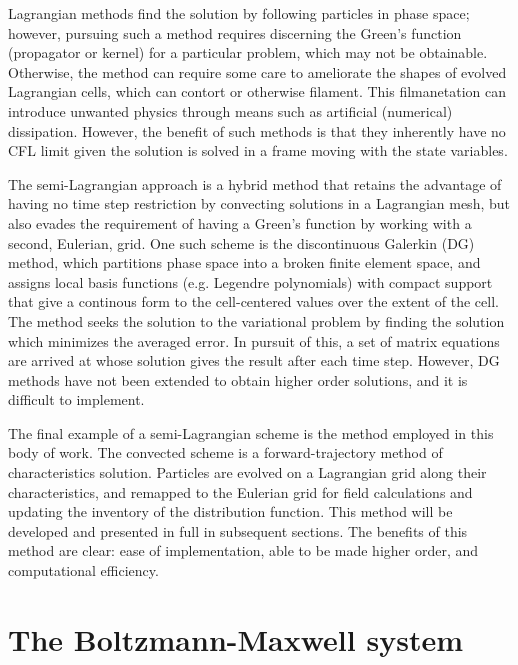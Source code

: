 \documentclass[11pt,titlepage]{report}
\begin{document}
Lagrangian methods find the solution by following particles in phase space; however, pursuing such a method requires discerning the Green's function (propagator or kernel) for a particular problem, which may not be obtainable. Otherwise, the method can require some care to ameliorate the shapes of evolved Lagrangian cells, which can contort or otherwise filament. This filmanetation can introduce unwanted physics through means such as artificial (numerical) dissipation. However, the benefit of such methods is that they inherently have no CFL limit given the solution is solved in a frame moving with the state variables. 

The semi-Lagrangian approach is a hybrid method that retains the advantage of having no time step restriction by convecting solutions in a Lagrangian mesh, but also evades the requirement of having a Green's function by working with a second, Eulerian, grid. One such scheme is the discontinuous Galerkin (DG) method, which partitions phase space into a broken finite element space, and assigns local basis functions (e.g. Legendre polynomials) with compact support that give a continous form to the cell-centered values over the extent of the cell. The method seeks the solution to the variational problem by finding the solution which minimizes the averaged error. In pursuit of this, a set of matrix equations are arrived at whose solution gives the result after each time step. However, DG methods have not been extended to obtain higher order solutions, and it is difficult to implement.

The final example of a semi-Lagrangian scheme is the method employed in this body of work. The convected scheme is a forward-trajectory method of characteristics solution. Particles are evolved on a Lagrangian grid along their characteristics, and remapped to the Eulerian grid for field calculations and updating the inventory of the distribution function. This method will be developed and presented in full in subsequent sections. The benefits of this method are clear: ease of implementation, able to be made higher order, and computational efficiency.

\section{The Boltzmann-Maxwell system}
\end{document}
